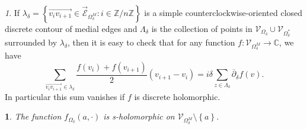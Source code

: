 \documentclass[oneside,english]{amsart}
\numberwithin{equation}{section}
\numberwithin{figure}{section}
\theoremstyle{plain}
\theoremstyle{plain}
\theoremstyle{plain}
\theoremstyle{plain}
\newtheorem{prop}[thm]{\protect\propositionname}
\theoremstyle{plain}
\theoremstyle{definition}
\theoremstyle{remark}
\newtheorem{rem}[thm]{\protect\remarkname}
\providecommand{\propositionname}{Proposition}
\providecommand{\remarkname}{Remark}
\begin{document}
\begin{rem}
\label{rem:discrete-integral}If $\lambda_{\delta}=\left\{ \overrightarrow{v_{i}v_{i+1}}\in\vec{\mathcal{E}}_{\Omega_{\delta}^{M}}:i\in\mathbb{Z}/n\mathbb{Z}\right\} $
is a simple counterclockwise-oriented closed discrete contour of medial
edges and $\Lambda_{\delta}$ is the collection of points in $\mathcal{V}_{\Omega_{\delta}}\cup\mathcal{V}_{\Omega_{\delta}^{*}}$
surrounded by $\lambda_{\delta}$, then it is easy to check that for
any function $f:\mathcal{V}_{\Omega_{\delta}^{M}}\to\mathbb{C}$,
we have 
\[
\sum_{\overrightarrow{v_{i}v_{i+1}}\in\lambda_{\delta}}\frac{f\left(v_{i}\right)+f\left(v_{i+1}\right)}{2}\left(v_{i+1}-v_{i}\right)=i\delta\sum_{z\in\Lambda_{\delta}}\overline{\partial}_{\delta}f\left(v\right).
\]
In particular this sum vanishes if $f$ is discrete holomorphic.\end{rem}
\begin{prop}
\label{pro:bounded-domain-observable-s-holomorphicity}The function
$f_{\Omega_{\delta}}\left(a,\cdot\right)$ is s-holomorphic on $\mathcal{V}_{\Omega_{\delta}^{M}}\setminus\left\{ a\right\} $. \end{prop}
\end{document}
